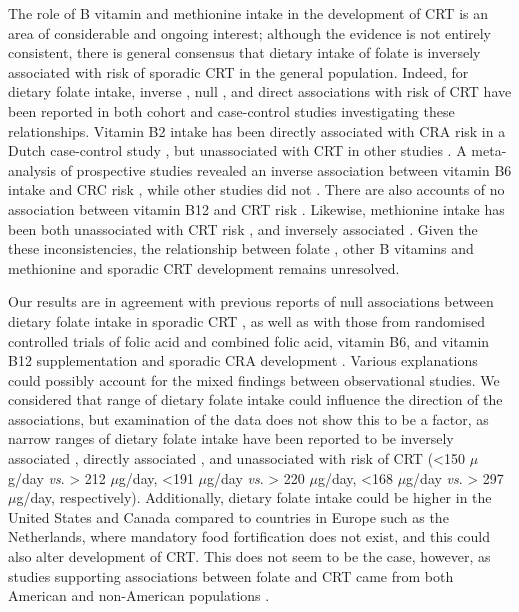 \noindent The role of B vitamin and methionine intake in the development of CRT is an area of considerable and ongoing interest; although the evidence is not entirely consistent, there is general consensus that dietary intake of folate is inversely associated with risk of sporadic CRT in the general population. Indeed, for dietary folate intake, inverse \cite{c616,c617,c634}, null \cite{c619,c622,c635,c636}, and direct \cite{c621} associations with risk of CRT have been reported in both cohort \cite{c617,c622,c634,c635} and case-control studies \cite{c616,c619,c621,c636} investigating these relationships. Vitamin B2 intake has been directly associated with CRA risk in a Dutch case-control study \cite{c621}, but unassociated with CRT in other studies \cite{c619,c620,c622,c635}. A meta-analysis of prospective studies revealed an inverse association between vitamin B6 intake and CRC risk \cite{c637}, while other studies did not \cite{c619,c620,c622,c638}. There are also accounts of no association between vitamin B12 and CRT risk \cite{c619,c620}. Likewise, methionine intake has been both unassociated with CRT risk \cite{c620,c635}, and inversely associated \cite{c622}. Given the these inconsistencies, the relationship between folate \cite{c639}, other B vitamins and methionine and sporadic CRT development remains unresolved.

\noindent Our results are in agreement with previous reports of null associations between dietary folate intake in sporadic CRT \cite{c619,c620,c622}, as well as with those from randomised controlled trials of folic acid and combined folic acid, vitamin B6, and vitamin B12 supplementation and sporadic CRA development \cite{c640,c641,c642}. Various explanations could possibly account for the mixed findings between observational studies. We considered that range of dietary folate intake could influence the direction of the associations, but examination of the data does not show this to be a factor, as narrow ranges of dietary folate intake have been reported to be inversely associated \cite{c643}, directly associated \cite{c621}, and unassociated \cite{c622} with risk of CRT (<150 $\mu$g/day \emph{vs}. > 212 $\mu$g/day, <191 $\mu$g/day \emph{vs}. > 220 $\mu$g/day, <168 $\mu$g/day \emph{vs}. > 297 $\mu$g/day, respectively). Additionally, dietary folate intake could be higher in the United States and Canada compared to countries in Europe such as the Netherlands, where mandatory food fortification does not exist, and this could also alter development of CRT. This does not seem to be the case, however, as studies supporting associations between folate and CRT came from both American \cite{c617} and non-American populations \cite{c616,c634}.

